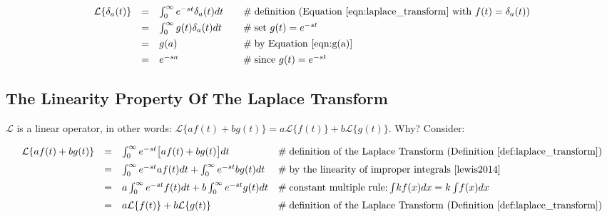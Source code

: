\documentclass{article}
\theoremstyle{definition}
\begin{document}
\bigskip
\begin{equation*}
\begin{array}{lllll}
\mathcal{L}\{\delta_a(t)\} 
&=& \int_0^\infty  e^{-st} \delta_a(t) dt    &\quad  \mathrel{\#} \text{definition (Equation \ref{eqn:laplace_transform} with $f(t) = \delta_a(t)$)} \\  
[4pt]                                                        %
&=& \int_0^\infty g(t) \delta_a(t) dt         &\quad  \mathrel{\#} \text{set $g(t) = e^{-st}$}                                                                                      \\
[4pt]                                                        %
&=& g(a)                                                &\quad  \mathrel{\#} \text{by Equation \ref{eqn:g(a)}}                                                                           \\
[4pt]                                                        %
&=& e^{-sa}                                            &\quad  \mathrel{\#} \text{since $g(t) = e^{-st}$}
\end{array}
\end{equation*}

\subsection{The Linearity Property Of The Laplace Transform}
\bigskip
\noindent
$\mathcal{L}$ is a linear operator, in other words: $\mathcal{L}\{af (t) + bg(t)\} = a\mathcal{L}\{f(t)\} + b\mathcal{L}\{g(t)\}$. Why? Consider:

\bigskip
\begin{equation*}
\begin{array}{lllll}
\mathcal{L}\{af (t) + bg(t)\} 
&=& \int_0^\infty e^{-st} \big [af (t) + bg(t) \big] dt                                & \mathrel{\#} \text{definition of the Laplace Transform (Definition \ref{def:laplace_transform})}   \\  
[6pt]                                                                                                     %
&=& \int_0^\infty e^{-st} af (t)  dt + \int_0^\infty e^{-st}  bg(t)  dt          & \mathrel{\#} \text{by the linearity of improper integrals \cite{lewis2014}}                                     \\
[6pt]                                                                                                     %
&=& a \int_0^\infty e^{-st}  f(t) dt + b \int_0^\infty e^{-st}  g(t) dt          & \mathrel{\#} \text{constant multiple rule:} \int \! k f(x) dx = k \int \! f(x) dx                                    \\
[6pt]                                                                                                     %
&=& a \mathcal{L}\{f(t)\}  + b \mathcal{L}\{g(t)\}                                   & \mathrel{\#} \text{definition of the Laplace Transform  (Definition \ref{def:laplace_transform})}
\end{array}
\end{equation*}
\end{document}
